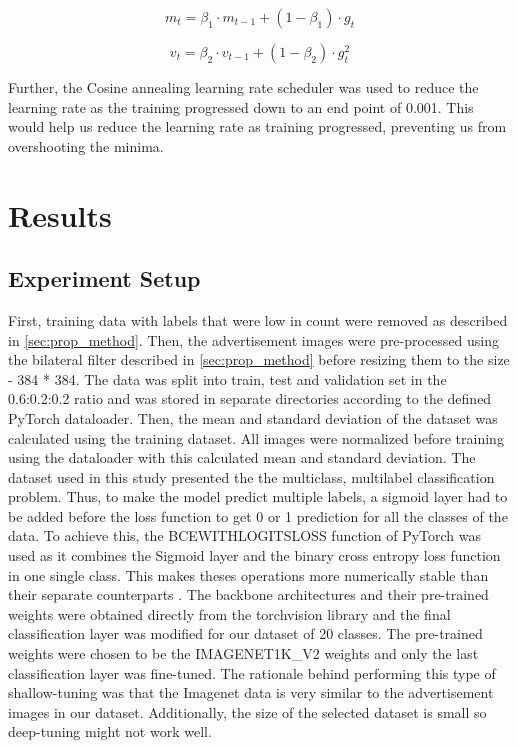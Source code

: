 \documentclass[conference]{IEEEtran}
\begin{document}
 \begin{equation}
 m_{t} = \beta_{1} \cdot m_{t-1} + (1 - \beta_{1}) \cdot g_{t}
 \label{eq:adam1}
 \end{equation}

 \begin{equation}
   v_{t} = \beta_{2} \cdot v_{t-1} + (1 - \beta_{2}) \cdot g_{t}^{2}
   \label{eq:adam2}
   \end{equation}

Further, the Cosine annealing \cite{b22} learning rate scheduler was used 
to reduce the learning rate as the training progressed down to an end point of 0.001. This 
would help us reduce the learning rate as training progressed, preventing us from overshooting the minima.

\section{Results} \label{sec:result}
\subsection{Experiment Setup}

First, training data with labels that were low in count were removed as described in \ref{sec:prop_method}. Then, the advertisement images were pre-processed using the bilateral filter described in \ref{sec:prop_method} before resizing them to the size - 384 * 384. The data was split into train, test and validation set in the 0.6:0.2:0.2 ratio and was stored in separate directories according to the defined PyTorch dataloader. 
Then, the mean and standard deviation of the dataset was calculated using the training dataset. All images were normalized before training using the dataloader with this calculated mean and standard deviation. The dataset used in this study presented the the multiclass, multilabel classification problem.  Thus, to make the model predict multiple labels, a sigmoid layer had to be added before the loss function to get 0 or 1 prediction for all the classes of the data. 
To achieve this, the BCEWITHLOGITSLOSS function of PyTorch was used as it combines the Sigmoid layer and the  binary cross entropy loss function in one single class. This makes 
theses operations more numerically stable than their separate counterparts \cite{23}.
The backbone architectures and their pre-trained weights were obtained directly from the 
torchvision library and the final classification layer was modified for our dataset of 20 classes. The pre-trained weights were chosen to be the IMAGENET1K\_V2 weights and only the last classification layer was fine-tuned. The rationale behind performing this type of 
shallow-tuning was that the Imagenet data is very similar to the advertisement images in our dataset. Additionally, the size of the selected dataset is small so deep-tuning might not work well. 
\end{document}

